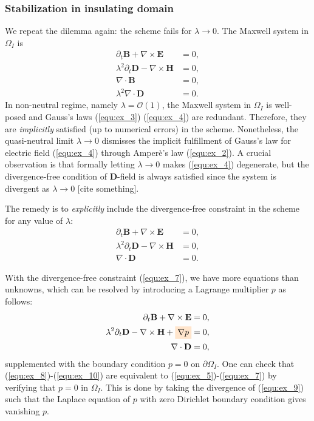 \documentclass{article}
\begin{document}
\subsubsection{Stabilization in insulating domain}
We repeat the dilemma again: the scheme fails for $\lambda \rightarrow 0$. The Maxwell system in $\Omega_I$ is    
\begin{align}
    \partial_t \mathbf{B} + \nabla \times \mathbf{E} &= 0, \label{equ:ex_1}\\ 
    \lambda^2 \partial_t \mathbf{D} - \nabla \times \mathbf{H} &= 0,  \label{equ:ex_2}\\
    \nabla \cdot \mathbf{B} &= 0, \label{equ:ex_3}\\
    \lambda^2 \nabla \cdot \mathbf{D} &= 0 \label{equ:ex_4}.
\end{align}
In non-neutral regime, namely $\lambda = \mathcal{O}(1)$, the Maxwell system in $\Omega_I$ is well-posed and Gauss's laws (\ref{equ:ex_3}) (\ref{equ:ex_4}) are redundant. Therefore, they are \emph{implicitly} satisfied (up to numerical errors) in the scheme. Nonetheless, the quasi-neutral limit $\lambda \rightarrow 0$ dismisses the implicit fulfillment of Gauss's law for electric field (\ref{equ:ex_4}) through Amper\`{e}'s law (\ref{equ:ex_2}). A crucial observation is that formally letting $\lambda \rightarrow 0$ makes (\ref{equ:ex_4}) degenerate, but the divergence-free condition of $\mathbf{D}$-field is always satisfied since the system is divergent as $\lambda \rightarrow 0$ [cite something]. 

The remedy is to \emph{explicitly} include the divergence-free constraint in the scheme for any value of $\lambda$:  
\begin{align}
    \partial_t \mathbf{B} + \nabla \times \mathbf{E} &= 0, \label{equ:ex_5}\\ 
    \lambda^2 \partial_t \mathbf{D} - \nabla \times \mathbf{H} &= 0,  \label{equ:ex_6}\\
    \nabla \cdot \mathbf{D} &= 0 \label{equ:ex_7}.
\end{align}

With the divergence-free constraint (\ref{equ:ex_7}), we have more equations than unknowns, which can be resolved by introducing a Lagrange multiplier $p$ as follows:
\begin{align}
    \partial_t \mathbf{B} + \nabla \times \mathbf{E} &= 0, \label{equ:ex_8}\\ 
    \lambda^2 \partial_t \mathbf{D} - \nabla \times \mathbf{H} + \colorbox{orange!20}{$\nabla p$} &= 0,  \label{equ:ex_9}\\
    \nabla \cdot \mathbf{D} &= 0 \label{equ:ex_10},
\end{align}
supplemented with the boundary condition $p = 0$ on $\partial\Omega_I$. One can check that (\ref{equ:ex_8})-(\ref{equ:ex_10}) are equivalent to (\ref{equ:ex_5})-(\ref{equ:ex_7}) by verifying that $p = 0$ in $\Omega_I$. This is done by taking the divergence of (\ref{equ:ex_9}) such that the Laplace equation of $p$ with zero Dirichlet boundary condition gives vanishing $p$. 
\end{document}
